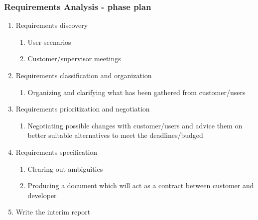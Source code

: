 \documentclass[12pt, a4paper]{report}   %
\begin{document}
\subsubsection{Requirements Analysis - phase plan}
\begin{enumerate}
	\item Requirements discovery
		\begin{enumerate}
			\item User scenarios
			\item Customer/supervisor meetings
		\end{enumerate}
	\item Requirements classification and organization
		\begin{enumerate}
			\item Organizing and clarifying what has been gathered from customer/users
		\end{enumerate}
	\item Requirements prioritization and negotiation
		\begin{enumerate}
			\item Negotiating possible changes with customer/users and advice them on better suitable alternatives to meet the deadlines/budged
		\end{enumerate}
	\item Requirements specification
		\begin{enumerate}
			\item Clearing out ambiguities
			\item Producing a document which will act as a contract between customer and developer
		\end{enumerate}
	\item Write the interim report
\end{enumerate}


\end{document}
